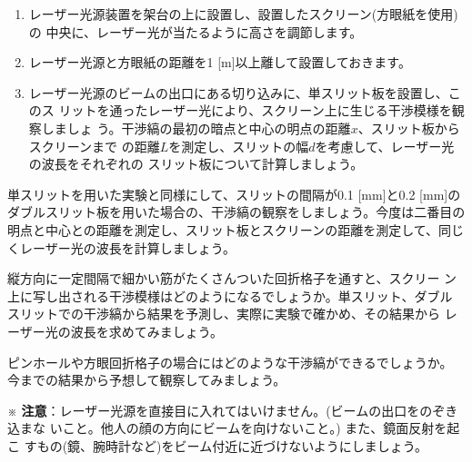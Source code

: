 \begin{enumerate}

\item レーザー光源装置を架台の上に設置し、設置したスクリーン(方眼紙を使用)の
中央に、レーザー光が当たるように高さを調節します。

\item レーザー光源と方眼紙の距離を1 [m]以上離して設置しておきます。

\item レーザー光源のビームの出口にある切り込みに、単スリット板を設置し、このス
リットを通ったレーザー光により、スクリーン上に生じる干渉模様を観察しましょ
う。干渉縞の最初の暗点と中心の明点の距離$x$、スリット板からスクリーンまで
の距離$L$を測定し、スリットの幅$d$を考慮して、レーザー光の波長をそれぞれの
スリット板について計算しましょう。


\end{enumerate}


単スリットを用いた実験と同様にして、スリットの間隔が0.1 [mm]と0.2 [mm]の 
ダブルスリット板を用いた場合の、干渉縞の観察をしましょう。今度は二番目の 
明点と中心との距離を測定し、スリット板とスクリーンの距離を測定して、同じ 
くレーザー光の波長を計算しましょう。

\bigskip


縦方向に一定間隔で細かい筋がたくさんついた回折格子を通すと、スクリー
ン上に写し出される干渉模様はどのようになるでしょうか。単スリット、ダブル
スリットでの干渉縞から結果を予測し、実際に実験で確かめ、その結果から
レーザー光の波長を求めてみましょう。



\bigskip



ピンホールや方眼回折格子の場合にはどのような干渉縞ができるでしょうか。
今までの結果から予想して観察してみましょう。


\bigskip


\hspace*{-\parindent}
※ {\bf 注意}：レーザー光源を直接目に入れてはいけません。(ビームの出口をのぞき込まな
いこと。他人の顔の方向にビームを向けないこと。) また、鏡面反射を起こ
すもの(鏡、腕時計など)をビーム付近に近づけないようにしましょう。